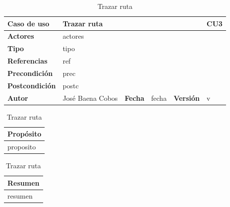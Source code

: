 \documentclass[12pt,spanish]{article}
\begin{document}
\begin{table}[H]
\centering
\begin{tabular}{|m{3cm}|m{4cm}|m{2cm}|m{2cm}|m{2cm}|m{1cm}|}
\hline
\textbf{Caso de uso} &  \multicolumn{4}{m{8cm}|}{Trazar ruta} \vline &  \cellcolor{gray!40}CU3 \\
\hline
\textbf{Actores} & \multicolumn{5}{m{8cm}|}{actores} \\
\hline
\textbf{Tipo} & \multicolumn{5}{m{8cm}|}{tipo} \\
\hline
\textbf{Referencias} &\multicolumn{5}{m{8cm}|}{ref} \\
\hline
\textbf{Precondición} & \multicolumn{5}{m{8cm}|}{prec} \\
\hline
\textbf{Postcondición} & \multicolumn{5}{m{8cm}|}{postc} \\
\hline
\textbf{Autor} & José Baena Cobos & \textbf{Fecha} & fecha & \textbf{Versión} & v \\
\hline
\end{tabular}

\vspace{1cm}

\begin{tabular}{|m{16.2cm}|}
\hline
\textbf{Propósito} \\
\hline
proposito \\
\hline
\end{tabular}

\vspace{1cm}

\begin{tabular}{|m{16.2cm}|}
\hline
\textbf{Resumen} \\
\hline
resumen \\
\hline
\end{tabular}

\caption{Trazar ruta}
\label{cu:3}
\end{table}


\end{document}
